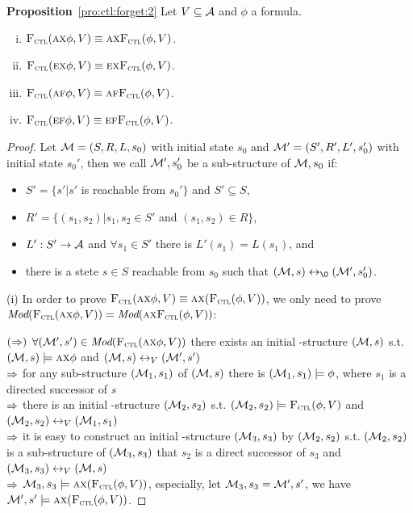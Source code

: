 \documentclass{article}
\begin{document}
\textbf{Proposition}~\ref{pro:ctl:forget:2}
Let $V\subseteq\cal A$ and $\phi$ a formula.%
  \begin{enumerate}[(i)]
    \item ${\textsc{F}_{\textsc{ctl}}}(\textsc{a}\textsc{x}\phi,V)\equiv \textsc{a}\textsc{x} {\textsc{F}_{\textsc{ctl}}}(\phi,V)$.
    \item ${\textsc{F}_{\textsc{ctl}}}(\textsc{e}\textsc{x}\phi,V)\equiv\textsc{e}\textsc{x} {\textsc{F}_{\textsc{ctl}}}(\phi,V)$.
    \item ${\textsc{F}_{\textsc{ctl}}}(\textsc{a} \textsc{f}\phi,V)\equiv \textsc{a} \textsc{f} {\textsc{F}_{\textsc{ctl}}}(\phi,V)$.
    \item ${\textsc{F}_{\textsc{ctl}}}(\textsc{e}\textsc{f}\phi,V)\equiv\textsc{e}\textsc{f} {\textsc{F}_{\textsc{ctl}}}(\phi,V)$.
  \end{enumerate}
\begin{proof}
Let ${\cal M}=(S, R, L,s_0)$ with initial state $s_0$ and ${\cal M}'=(S', R', L',s_0')$ with initial state $s_0'$, then we call ${\cal M}', s_0'$ be a sub-structure of ${\cal M},s_0$ if:
\begin{itemize}
  \item $S'=\{s' | s'$ is reachable from $s_0'\}$ and $S' \subseteq S$,
  \item $R' =\{(s_1, s_2)| s_1, s_2 \in S'$ and $(s_1, s_2) \in R\}$,
  \item $L': S' \rightarrow {\cal A}$ and $\forall s_1 \in S'$ there is $L'(s_1) = L(s_1)$, and
  \item there is a stete $s\in S$ reachable from $s_0$ such that $(\Hm, s) \lrto_{{\O}} (\Hm', s_0')$.
\end{itemize}

(i) In order to prove ${\textsc{F}_{\textsc{ctl}}}(\textsc{a} \textsc{x} \phi, V) \equiv \textsc{a} \textsc{x}({\textsc{F}_{\textsc{ctl}}}(\phi, V))$, we only need to prove $\textit{Mod}({\textsc{F}_{\textsc{ctl}}}(\textsc{a} \textsc{x} \phi, V)) = \textit{Mod}( \textsc{a}\textsc{x}{\textsc{F}_{\textsc{ctl}}}(\phi, V))$:

$(\Rightarrow)$ $\forall ({\cal M}', s') \in \textit{Mod}({\textsc{F}_{\textsc{ctl}}}(\textsc{a} \textsc{x} \phi, V))$ there exists an initial \MPK-structure $({\cal M}, s)$ s.t. $({\cal M}, s)\models \textsc{a} \textsc{x} \phi$ and $({\cal M}, s) \leftrightarrow_V ({\cal M}',s')$\\
$\Rightarrow$ for any sub-structure $({\cal M}_1, s_1)$ of $({\cal M}, s)$ there is $({\cal M}_1, s_1) \models \phi$, where $s_1$ is a directed successor of $s$ \\
$\Rightarrow$ there is an initial \MPK-structure $({\cal M}_2, s_2)$ s.t. $({\cal M}_2, s_2) \models {\textsc{F}_{\textsc{ctl}}}(\phi,V)$ and $({\cal M}_2, s_2) \leftrightarrow_V ({\cal M}_1,s_1)$\\
$\Rightarrow$ it is easy to construct an initial \MPK-structure $({\cal M}_3, s_3)$ by $({\cal M}_2, s_2)$ s.t. $({\cal M}_2, s_2)$ is a sub-structure of $({\cal M}_3, s_3)$ that $s_2$ is a direct successor of $s_3$ and $({\cal M}_3, s_3) \leftrightarrow_V ({\cal M},s)$\\
$\Rightarrow$ ${\cal M}_3, s_3 \models \textsc{a} \textsc{x} ({\textsc{F}_{\textsc{ctl}}}(\phi,V))$, especially, let ${\cal M}_3, s_3 = {\cal M}', s'$, we have ${\cal M}', s' \models \textsc{a} \textsc{x} ({\textsc{F}_{\textsc{ctl}}}(\phi,V))$.


\end{proof}
\end{document}
